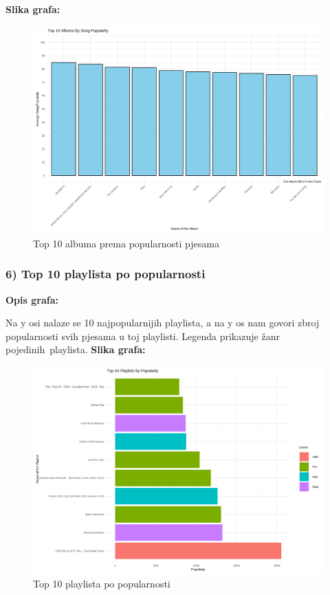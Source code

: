 	
	\textbf{Slika grafa:}
	\begin{figure}[H]
		\includegraphics[scale=0.9]{slike/albums_by_song_popularity.png}
		\centering
		\caption{Top 10 albuma prema popularnosti pjesama}
		
	\end{figure}
	
	\subsubsection{6) Top 10 playlista po popularnosti}
	
	\textbf{Opis grafa:}
	
	Na y osi nalaze se 10 najpopularnijih playlista, a na y os nam govori zbroj popularnosti svih pjesama u toj playlisti. Legenda prikazuje žanr pojedinih playlista. 
	\textbf{Slika grafa:}
	\begin{figure}[H]
		\includegraphics[scale=0.9]{slike/playlists_by_popularity.png}
		\centering
		\caption{Top 10 playlista po popularnosti}
		
	\end{figure}
	
